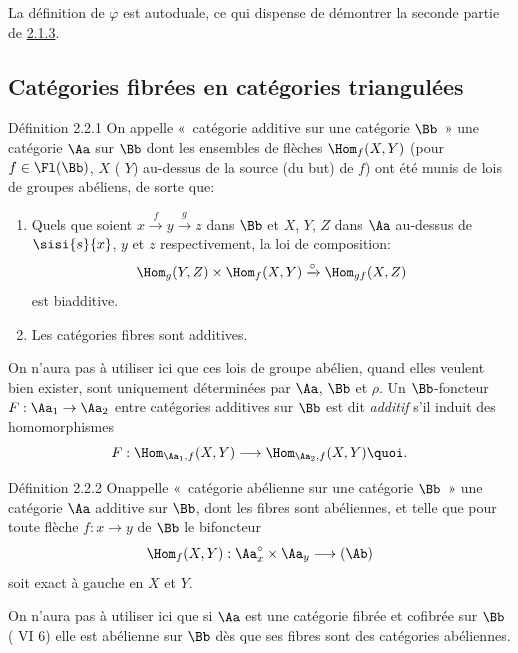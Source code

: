 \documentclass[10pt]{../fichiers-configuration-latex/smfart}
\begin{document}
La définition de $\varphi$ est autoduale, ce qui dispense de démontrer
la seconde partie de \hyperref[XVII.prop2.1.3]{2.1.3}.

\subsection{Catégories fibrées en catégories triangulées}

\begin{enonce*}{Définition 2.2.1}
On appelle « catégorie additive sur une catégorie $\Bb$ »
une catégorie $\Aa$ sur $\Bb$ dont les ensembles de
flèches $\Hom_f(X,Y)$ (pour $f\in \Fl (\Bb)$, $X$ (\resp
$Y$) au-dessus de la source (\resp du but) de $f$) ont été munis de
lois de groupes abéliens, de sorte que:
\begin{enumerate}
\renewcommand{\theenumi}{\roman{enumi}}
\renewcommand{\labelenumi}{(\theenumi)}
\item Quels que soient $x\xrightarrow{f}y\xrightarrow{g}z$ dans
$\Bb$ et $X$, $Y$, $Z$ dans $\Aa$ au-dessus de $\sisi{s}{x}$,
$y$ et $z$ respectivement, la loi de composition:
\[
\Hom_g(Y,Z)\times \Hom_f
(X,Y)\xrightarrow{\circ}\Hom_{gf}(X,Z)
\]
est biadditive.

\item Les catégories fibres sont additives.
\end{enumerate}
\end{enonce*}

On n'aura pas à utiliser ici que ces lois de groupe abélien, quand
elles veulent bien exister, sont uniquement déterminées par
$\Aa$, $\Bb$ et $\rho$. Un $\Bb$-foncteur
$F:\Aa_1\rightarrow \Aa_2$ entre catégories additives
sur $\Bb$ est dit \emph{additif} s'il induit des
homomorphismes
\[
F:\Hom_{\Aa_1,f}(X,Y)\longrightarrow
\Hom_{\Aa_{2},f}(X,Y){\quoi}.
\]

\begin{enonce*}{Définition 2.2.2}
On\pageoriginale appelle « catégorie abélienne sur une catégorie
$\Bb$ »  une catégorie $\Aa$ additive sur
$\Bb$, dont les fibres sont abéliennes, et telle que pour
toute flèche $f:x\rightarrow y$ de $\Bb$ le bifoncteur
\[
\Hom_f(X,Y):\Aa^{\circ}_x\times \Aa_y\longrightarrow
(\Ab)
\]
soit exact à gauche en $X$ et $Y$.
\end{enonce*}

On n'aura pas à utiliser ici que si $\Aa$ est une catégorie
fibrée et cofibrée sur $\Bb$ ( VI 6) elle est abélienne
sur $\Bb$ dès que ses fibres sont des catégories abéliennes.
\end{document}
